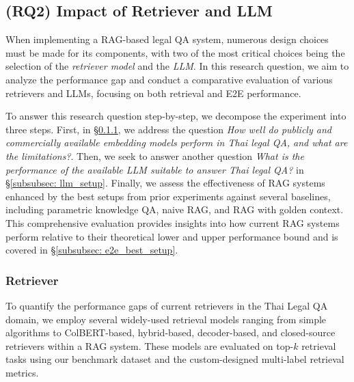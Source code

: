 \subsection{(RQ2) Impact of Retriever and LLM}
\label{subsec: setup_rq2}
When implementing a RAG-based legal QA system, numerous design choices must be made for its components, with two of the most critical choices being the selection of the \textit{retriever model} and the \textit{LLM}. 
%
In this research question, we aim to analyze the performance gap and conduct a comparative evaluation of various retrievers and LLMs, focusing on both retrieval and E2E performance.

To answer this research question step-by-step, we decompose the experiment into three steps.
%
First, in \S\ref{subsubsec: retriever_setup}, we address the question \textit{How well do publicly and commercially available embedding models perform in Thai legal QA, and what are the limitations?}. 
%
Then, we seek to answer another question \textit{What is the performance of the available LLM suitable to answer Thai legal QA?} in \S\ref{subsubsec: llm_setup}.
%
Finally, we assess the effectiveness of RAG systems enhanced by the best setups from prior experiments against several baselines, including parametric knowledge QA, naive RAG, and RAG with golden context. 
%
This comprehensive evaluation provides insights into how current RAG systems perform relative to their theoretical lower and upper performance bound and is covered in \S\ref{subsubsec: e2e_best_setup}.

\subsubsection{Retriever}
\label{subsubsec: retriever_setup}
To quantify the performance gaps of current retrievers in the Thai Legal QA domain, we employ several widely-used retrieval models ranging from simple algorithms to ColBERT-based, hybrid-based, decoder-based, and closed-source retrievers within a RAG system. 
%
These models are evaluated on top-$k$ retrieval tasks using our benchmark dataset and the custom-designed multi-label retrieval metrics.

